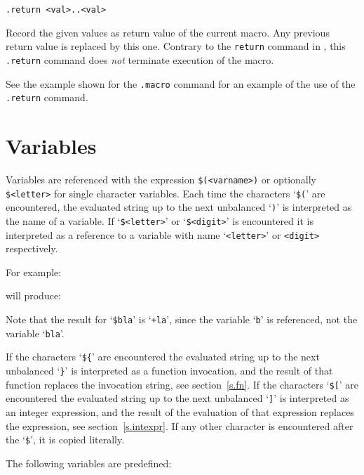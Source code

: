 \begin{verbatim}
.return <val>..<val>
\end{verbatim}
\begin{desc}
Record the given values as return value of the current macro.
Any previous return value is replaced by this one.
Contrary to the \texttt{return} command in {\C}, this \verb+.return+
command does \emph{not} terminate execution of the macro.

See the example shown for the \verb'.macro' command for an example of the
use of the \verb'.return' command.
\end{desc}
\section{Variables}
Variables are referenced with the expression
\texttt{\$(<varname>)} or optionally \texttt{\$<letter>} for single character
variables.
Each time the characters `\texttt{\$(}' are encountered,
the evaluated string up to the next unbalanced `\texttt{)}' 
is interpreted as the name of a variable.
If `\texttt{\$<letter>}' or `\texttt{\$<digit>}' is encountered it is interpreted as
a reference to a variable with name `\texttt{<letter>}' or \texttt{<digit>}
respectively.

For example:
\begin{showfile}

\end{showfile}
will produce:
\begin{showfile}

\end{showfile}
Note that the result for `\verb+$bla+' is `\texttt{+la}', since the
variable `\texttt{b}' is referenced, not the variable `\texttt{bla}'.

If the characters `\texttt{\$\{}' are encountered the evaluated string up to
the next unbalanced `\texttt{\}}' is interpreted as a function invocation,
and the result of that function replaces the invocation string,
see section~\ref{s.fn}.
If the characters `\texttt{\$[}' are encountered the evaluated string up
to the next unbalanced `\texttt{]}' is interpreted as an integer expression,
and the result of the evaluation of that expression replaces the expression,
see section~\ref{s.intexpr}.
If any other character is encountered after the `\texttt{\$}',
it is copied literally.

The following variables are predefined:

